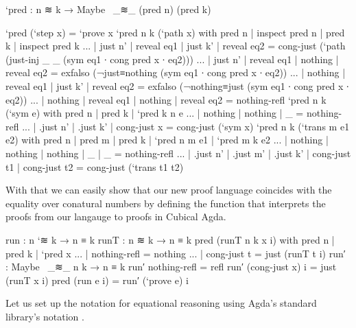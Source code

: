 \begin{code}
`pred : n ≋ k → Maybe~ _≋_ (pred n) (pred k)
\end{code}
\begin{code}[hide]
`pred (`step x) = `prove x
`pred {n} {k} (`path x) with pred n | inspect pred n | pred k | inspect pred k
... | just n' | reveal eq1 | just k' | reveal eq2 = cong-just (`path (just-inj _ _ (sym eq1 ∙ cong pred x ∙ eq2)))
... | just n' | reveal eq1 | nothing | reveal eq2 = exfalso (¬just≡nothing (sym eq1 ∙ cong pred x ∙ eq2))
... | nothing | reveal eq1 | just k' | reveal eq2 = exfalso (¬nothing≡just (sym eq1 ∙ cong pred x ∙ eq2))
... | nothing | reveal eq1 | nothing | reveal eq2 = nothing-refl
`pred {n} {k} (`sym e) with pred n | pred k | `pred {k} {n} e
... | nothing  | nothing  | _ = nothing-refl
... | .just n' | .just k' | cong-just x = cong-just (`sym x)
`pred {n} {k} (`trans {m} e1 e2) with pred n | pred m | pred k | `pred {n} {m} e1 | `pred {m} {k} e2
... | nothing  | nothing  | nothing  | _  | _  = nothing-refl
... | .just n' | .just m' | .just k' | cong-just t1 | cong-just t2 = cong-just (`trans t1 t2)
\end{code}

With that we can easily show that our new proof language coincides with the equality over conatural numbers
by defining the  function that interprets the proofs from our langauge to
proofs in Cubical Agda.

\begin{code}
run : n `≋ k → n ≡ k
runT : n ≋ k → n ≡ k
pred (runT {n} {k} x i) with {pred n} | {pred k} | `pred x
... | nothing-refl = nothing
... | cong-just t = just (runT t i)
run′ : Maybe~ _≋_ n k → n ≡ k
run′ nothing-refl = refl
run′ (cong-just x) i = just (runT x i)
pred (run e i) = run′ (`prove e) i
\end{code}

Let us set up the notation for equational reasoning using
Agda's standard library's notation \cite{agda-stdlib}.

